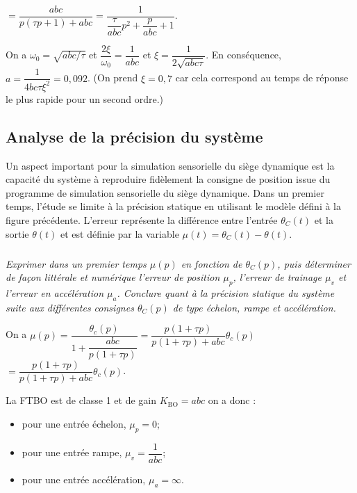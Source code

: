 \documentclass[10pt,fleqn]{article} %
\begin{document}
\begin{multicols}{2}
\begin{corrige}
$=\dfrac{{abc}}{p\left( \tau p + 1\right)+{abc}}=\dfrac{1}{ \dfrac{\tau}{abc} p^2 + \dfrac{p}{abc}+1}$.

On a $\omega_0 = \sqrt{abc/\tau}$ et $\dfrac{2\xi}{\omega_0}=\dfrac{1}{abc}$ et 
$\xi=\dfrac{1}{2\sqrt{abc\tau}}$. 
En conséquence, ${a}=\dfrac{1}{4bc\tau\xi^2}=0,092$. (On prend $\xi=0,7$ car cela correspond au temps de réponse le plus rapide pour un second ordre.)
\end{corrige}
\else
\fi
  

\subsection*{Analyse de la précision du système}

Un aspect important pour la simulation sensorielle du siège dynamique
est la capacité du système à reproduire fidèlement la consigne de
position issue du programme de simulation sensorielle du siège
dynamique. Dans un premier temps, l'étude se limite à la précision
statique en utilisant le modèle défini à la figure précédente. L'erreur
représente la différence entre l'entrée $\theta_C(t)$ et la
sortie $\theta(t)$ et est définie par la variable $\mu(t) = \theta_C(t)-\theta(t)$.


\subparagraph{}\textit{ Exprimer dans un premier temps $\mu(p)$ en fonction de
  $\theta_C(p)$, puis déterminer de façon littérale et numérique
  l'erreur de position $\mu_p$, l'erreur de trainage
  $\mu_v$ et l'erreur en accélération $\mu_a$.
  Conclure quant à la précision statique du système suite aux
  différentes consignes $\theta_C(p)$ de type échelon, rampe et
  accélération.}

\ifprof
\begin{corrige}
On a $\mu(p)=\dfrac{\theta_c(p)}{1+\dfrac{abc}{p\left( 1+\tau p\right)}}=\dfrac{p\left( 1+\tau p\right)}{p\left( 1+\tau p\right)+abc}\theta_c(p)$ $=\dfrac{p\left( 1+\tau p\right)}{p\left( 1+\tau p\right)+abc}\theta_c(p)$.

La FTBO est de classe 1 et de gain $K_{\text{BO}}={abc}$ on a donc : 
\begin{itemize}
\item pour une entrée échelon, $\mu_p = 0$;
\item pour une entrée rampe, $\mu_v = \dfrac{1}{abc}$;
\item pour une entrée accélération, $\mu_a = \infty$.
\end{itemize}
\end{corrige}
\else
\fi


\end{multicols}
\end{document}
